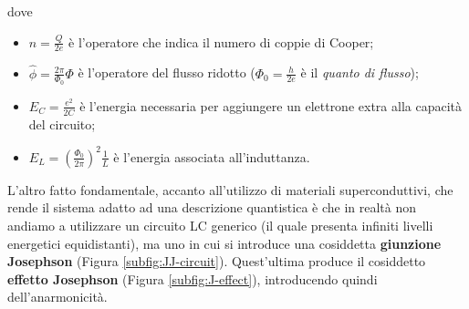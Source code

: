dove
\begin{itemize}
    \item $\hat n = \frac{Q}{2e}$ è l'operatore che indica il numero di coppie di Cooper;
    \item $\hat \phi = \frac{2\pi}{\Phi_0}\Phi$ è l'operatore del flusso ridotto ($\Phi_0=\frac{h}{2e}$ è il \textit{quanto di flusso});
    \item $E_C=\frac{e^2}{2C}$ è l'energia necessaria per aggiungere un elettrone extra alla capacità del circuito;
    \item $E_L=\left(\frac{\Phi_0}{2\pi}\right)^2\frac 1 L$ è l'energia associata all'induttanza.
\end{itemize}
L'altro fatto fondamentale, accanto all'utilizzo di materiali superconduttivi, che rende il sistema adatto ad una descrizione quantistica è che in realtà non andiamo a utilizzare un circuito LC generico (il quale presenta infiniti livelli energetici equidistanti), ma uno in cui si introduce una cosiddetta \textbf{giunzione Josephson} (Figura \ref{subfig:JJ-circuit}). Quest'ultima produce il cosiddetto \textbf{effetto Josephson} (Figura \ref{subfig:J-effect}),  introducendo quindi dell'anarmonicità. 

